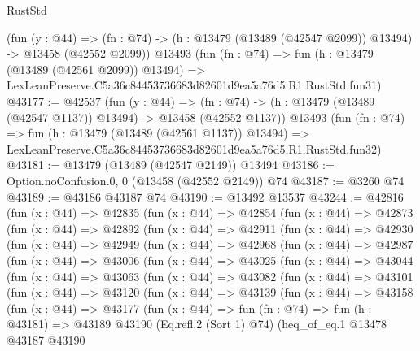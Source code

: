 \begin{lexlean}{RustStd}
\begin{coremodule}
    (fun (y : @44) =>
    (fn : @74) -> (h : @13479 (@13489 (@42547 @2099)) @13494) -> @13458 (@42552 @2099))
    @13493
    (fun (fn : @74) =>
    fun (h : @13479 (@13489 (@42561 @2099)) @13494) =>
    LexLeanPreserve.C5a36c84453736683d82601d9ea5a76d5.R1.RustStd.fun31)
@43177 := @42537
    (fun (y : @44) =>
    (fn : @74) -> (h : @13479 (@13489 (@42547 @1137)) @13494) -> @13458 (@42552 @1137))
    @13493
    (fun (fn : @74) =>
    fun (h : @13479 (@13489 (@42561 @1137)) @13494) =>
    LexLeanPreserve.C5a36c84453736683d82601d9ea5a76d5.R1.RustStd.fun32)
@43181 := @13479 (@13489 (@42547 @2149)) @13494
@43186 := Option.noConfusion.{0, 0} (@13458 (@42552 @2149)) @74
@43187 := @3260 @74
@43189 := @43186 @43187 @74
@43190 := @13492 @13537
@43244 := @42816
    (fun (x : @44) =>
    @42835
      (fun (x : @44) =>
      @42854
        (fun (x : @44) =>
        @42873
          (fun (x : @44) =>
          @42892
            (fun (x : @44) =>
            @42911
              (fun (x : @44) =>
              @42930
                (fun (x : @44) =>
                @42949
                  (fun (x : @44) =>
                  @42968
                    (fun (x : @44) =>
                    @42987
                      (fun (x : @44) =>
                      @43006
                        (fun (x : @44) =>
                        @43025
                          (fun (x : @44) =>
                          @43044
                            (fun (x : @44) =>
                            @43063
                              (fun (x : @44) =>
                              @43082
                                (fun (x : @44) =>
                                @43101
                                  (fun (x : @44) =>
                                  @43120
                                    (fun (x : @44) =>
                                    @43139
                                      (fun (x : @44) =>
                                      @43158
                                        (fun (x : @44) =>
                                        @43177
                                          (fun (x : @44) =>
                                          fun (fn : @74) =>
                                          fun (h : @43181) =>
                                          @43189
                                            @43190
                                            (Eq.refl.{2} (Sort 1) @74)
                                            (heq_of_eq.{1}
                                              @13478
                                              @43187
                                              @43190

\end{coremodule}
\end{lexlean}

